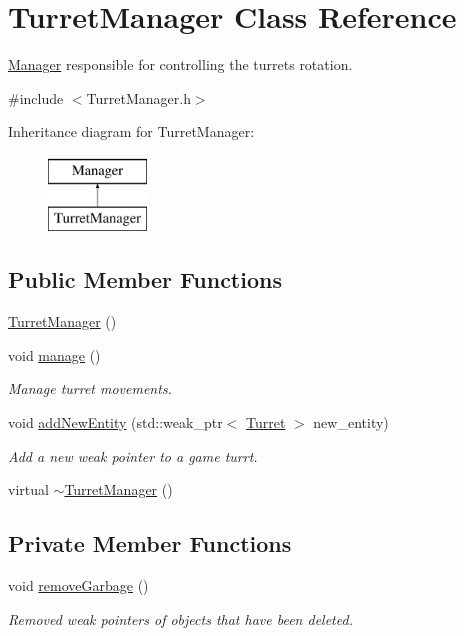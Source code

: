 \hypertarget{classTurretManager}{\section{Turret\-Manager Class Reference}
\label{classTurretManager}
}


\hyperlink{classManager}{Manager} responsible for controlling the turrets rotation.  




{\ttfamily \#include $<$Turret\-Manager.\-h$>$}

Inheritance diagram for Turret\-Manager\-:\begin{figure}[H]
\begin{center}
\leavevmode
\includegraphics[height=2.000000cm]{classTurretManager}
\end{center}
\end{figure}
\subsection*{Public Member Functions}
\begin{DoxyCompactItemize}
\item 
\hyperlink{classTurretManager_a81d31a8afa69beed2e1e9ee92a148b62}{Turret\-Manager} ()
\item 
void \hyperlink{classTurretManager_a3339500bc4e12ed437681876ca702bd3}{manage} ()
\begin{DoxyCompactList}\small\item\em Manage turret movements. \end{DoxyCompactList}\item 
void \hyperlink{classTurretManager_a61a5c5fe1961ca9483271da3aeac0489}{add\-New\-Entity} (std\-::weak\-\_\-ptr$<$ \hyperlink{classTurret}{Turret} $>$ new\-\_\-entity)
\begin{DoxyCompactList}\small\item\em Add a new weak pointer to a game turrt. \end{DoxyCompactList}\item 
virtual \hyperlink{classTurretManager_a223f756a6c40df2487a0b98b640c3155}{$\sim$\-Turret\-Manager} ()
\end{DoxyCompactItemize}
\subsection*{Private Member Functions}
\begin{DoxyCompactItemize}
\item 
void \hyperlink{classTurretManager_af403fc2ffe83d4c3b017251dbcbd52f6}{remove\-Garbage} ()
\begin{DoxyCompactList}\small\item\em Removed weak pointers of objects that have been deleted. \end{DoxyCompactList}\end{DoxyCompactItemize}
